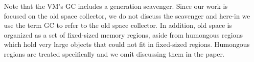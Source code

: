 \documentclass[sigplan,10pt,review,anonymous]{acmart}\settopmatter{printfolios=true,printccs=false,printacmref=false}
\def\OpenSmalltalkVM{OpenSmalltalk-VM\xspace}
\def\ie{\emph{i.e., }}
\begin{document}
Note that the VM's GC includes a generation scavenger. Since our work is focused on the old space collector, we do not discuss the scavenger and here-in we use the term GC to refer to the old space collector. In addition, old space is organized as a set of fixed-sized memory regions, aside from humongous regions which hold very large objects that could not fit in fixed-sized regions. Humongous regions are treated specifically and we omit discussing them in the paper.


%
\end{document}
